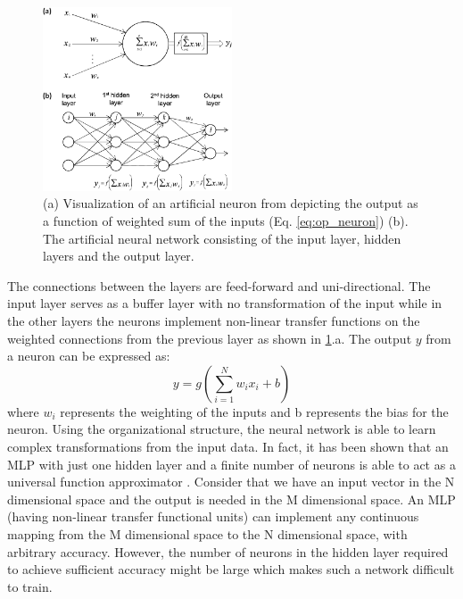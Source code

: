 \documentclass[msthesis.tex]{subfiles}
\begin{document}
\begin{figure}
    \centering
    \includegraphics[width=0.5\textwidth]{images/tnn_ann.png}
    \caption{(a) Visualization of an artificial neuron from \cite{vieira2017using} depicting the output as a function of weighted sum of the inputs (Eq. \ref{eq:op_neuron}) (b). The artificial neural network consisting of the input layer, hidden layers and the output layer.}
    \label{fig:mlp}
\end{figure}
The connections between the layers are feed-forward and uni-directional. The input layer serves as a buffer layer with no transformation of the input while in the other layers the neurons implement non-linear transfer functions on the weighted connections from the previous layer as shown in \cref{fig:mlp}.a. The output $y$ from a neuron can be expressed as:
\begin{equation}
    \label{eq:op_neuron}
    y = g(\sum_{i=1}^{N} w_i x_i +b) 
\end{equation}
where $w_i$ represents the weighting of the inputs and b represents the bias for the neuron. Using the organizational structure, the neural network is able to learn complex transformations from the input data. In fact, it has been shown that an \gls{MLP} with just one hidden layer and a finite number of neurons is able to act as a universal function approximator \citep{universal_mlp}. Consider that we have an input vector in the N dimensional space and the output is needed in the M dimensional space. An \gls{MLP} (having non-linear transfer functional units) can implement any continuous mapping from the M dimensional space to the N dimensional space, with arbitrary accuracy. However, the number of neurons in the hidden layer required to achieve sufficient accuracy might be large which makes such a network difficult to train.
\end{document}
